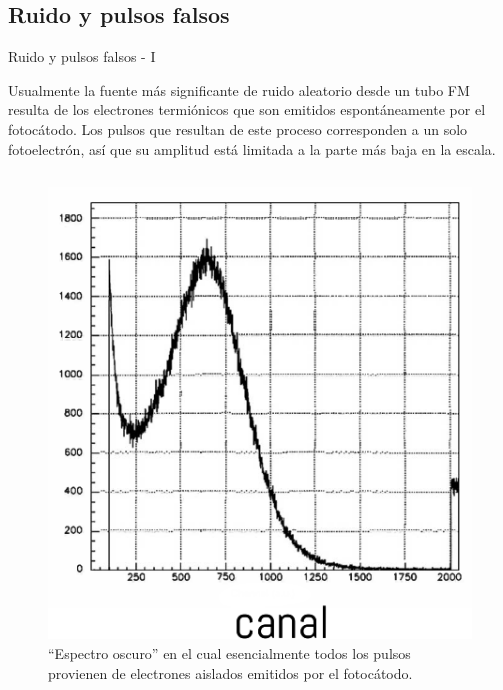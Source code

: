 \documentclass[a4paper,10pt]{beamer}
\begin{document}
\subsection{Ruido y pulsos falsos}
\begin{frame}{Ruido y pulsos falsos - I}
 \begin{justify}
  
  Usualmente la fuente más significante de ruido aleatorio desde un tubo FM resulta 
  de los electrones termiónicos que son emitidos espontáneamente por el fotocátodo.
  Los pulsos que resultan de este proceso corresponden a un solo fotoelectrón, así que 
  su amplitud está limitada a la parte más baja en la escala.
  
 \end{justify}
 
 \begin{columns}[c]
  
 \column{2in}
 \begin{figure}
  \center 
  \includegraphics[scale=0.23]{fig27a}
  \caption{``Espectro oscuro'' en el cual esencialmente todos los pulsos provienen de 
  electrones aislados emitidos por el fotocátodo.}
 \end{figure}


\end{columns}
\end{frame}
\end{document}
